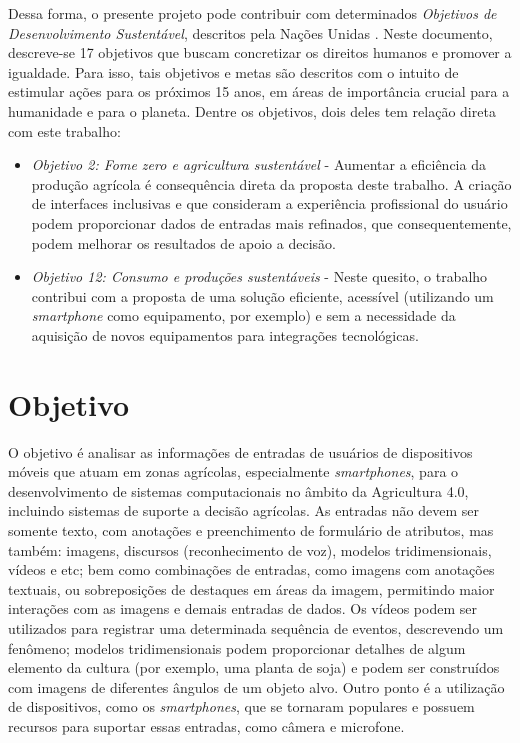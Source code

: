 \documentclass[12pt]{article}
\begin{document}
Dessa forma, o presente projeto pode contribuir com determinados \textit{Objetivos de Desenvolvimento Sustentável}, descritos pela Nações Unidas \cite{UN:2020}. Neste documento, descreve-se 17 objetivos que buscam concretizar os direitos humanos e promover a igualdade. Para isso, tais objetivos e metas são descritos com o intuito de estimular ações para os próximos 15 anos, em áreas de importância crucial para a humanidade e para o planeta. Dentre os objetivos, dois deles tem relação direta com este trabalho:

\begin{itemize}
	\item \textit{Objetivo 2: Fome zero e agricultura sustentável} - Aumentar a eficiência da produção agrícola é consequência direta da proposta deste trabalho. A criação de interfaces inclusivas e que consideram a experiência profissional do usuário podem proporcionar dados de entradas mais refinados, que consequentemente, podem melhorar os resultados de apoio a decisão.
	\item \textit{Objetivo 12: Consumo e produções sustentáveis} - Neste quesito, o trabalho contribui com a proposta de uma solução eficiente, acessível (utilizando um \textit{smartphone} como equipamento, por exemplo) e sem a necessidade da aquisição de novos equipamentos para integrações tecnológicas.
\end{itemize}

\section{Objetivo}
\label{sec:objetivo}

O objetivo é analisar as informações de entradas de usuários de dispositivos móveis que atuam em zonas agrícolas, especialmente \textit{smartphones}, para o desenvolvimento de sistemas computacionais no âmbito da Agricultura 4.0, incluindo sistemas de suporte a decisão agrícolas. As entradas não devem ser somente texto, com anotações e preenchimento de formulário de atributos, mas também: imagens, discursos (reconhecimento de voz), modelos tridimensionais, vídeos e etc; bem como combinações de entradas, como imagens com anotações textuais, ou sobreposições de destaques em áreas da imagem, permitindo maior interações com as imagens e demais entradas de dados. Os vídeos podem ser utilizados para registrar uma determinada sequência de eventos, descrevendo um fenômeno; modelos tridimensionais podem proporcionar detalhes de algum elemento da cultura (por exemplo, uma planta de soja) e podem ser construídos com imagens de diferentes ângulos de um objeto alvo. Outro ponto é a utilização de dispositivos, como os \textit{smartphones}, que se tornaram populares e possuem recursos para suportar essas entradas, como câmera e microfone.
\end{document}
